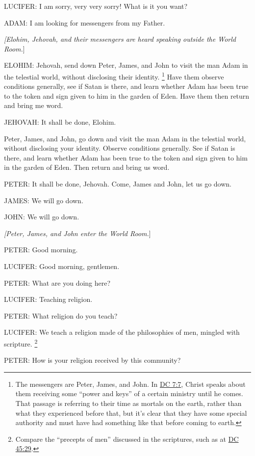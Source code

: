 			LUCIFER: I am sorry, very very sorry! What is it you want?

			ADAM: I am looking for messengers from my Father.
			
			\textit{[Elohim, Jehovah, and their messengers are heard speaking outside the World Room.}]

			ELOHIM: Jehovah, send down Peter, James, and John to visit the man Adam in the telestial world, without disclosing their identity.%
				\footnote{%
					The messengers are Peter, James, and John. In \hyperref[DC7-7]{DC 7:7}, Christ speaks about them receiving some ``power and keys'' of a certain ministry until he comes. That passage is referring to their time as mortals on the earth, rather than what they experienced before that, but it's clear that they have some special authority and must have had something like that before coming to earth.
					}
			Have them observe conditions generally, see if Satan is there, and learn whether Adam has been true to the token and sign given to him in the garden of Eden. Have them then return and bring me word.

			JEHOVAH: It shall be done, Elohim.

			Peter, James, and John, go down and visit the man Adam in the telestial world, without disclosing your identity. Observe conditions generally. See if Satan is there, and learn whether Adam has been true to the token and sign given to him in the garden of Eden. Then return and bring us word.

			PETER: It shall be done, Jehovah. Come, James and John, let us go down.

			JAMES: We will go down.

			JOHN: We will go down.

			\textit{[Peter, James, and John enter the World Room.}]

			PETER: Good morning.

			LUCIFER: Good morning, gentlemen.

			PETER: What are you doing here?

			LUCIFER: Teaching religion.

			PETER: What religion do you teach?

			LUCIFER: We teach a religion made of the philosophies of men, mingled with scripture.%
				\footnote{%
					Compare the ``precepts of men'' discussed in the scriptures, such as at \hyperref[DC45-29]{DC 45:29}.
					}

			PETER: How is your religion received by this community?

